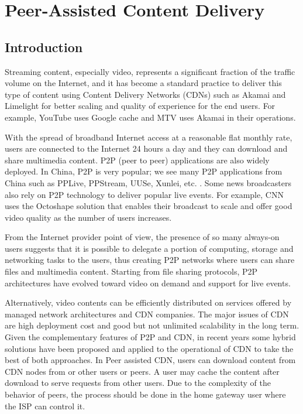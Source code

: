 \chapter{Peer-Assisted Content Delivery}

\section{Introduction}

Streaming content, especially video, represents a significant fraction of the traffic volume on the Internet, and it has become a standard practice to deliver this type of content using Content Delivery Networks (CDNs) such as Akamai and Limelight for better scaling and quality of experience for the end users. 
For example, YouTube uses Google cache and MTV uses Akamai in their operations.

With the spread of broadband Internet access at a reasonable flat monthly rate, users are connected to the Internet 24 hours a day and they can download and share multimedia content. P2P (peer to peer) applications are also widely deployed. 
In China, P2P is very popular; we see many P2P applications from China such as PPLive, PPStream, UUSe, Xunlei, etc. \cite{Vu:2010:UOC:1865106.1865115}. 
Some news broadcasters also rely on P2P technology to deliver popular live events. 
For example, CNN uses the Octoshape \cite{octoshape} solution that enables their broadcast to scale and offer good video quality as the number of users increases.

From the Internet provider point of view, the presence of so many always-on users suggests that it is possible to delegate a portion of computing, storage and networking tasks to the users, thus creating P2P networks where users can share files and multimedia content. 
Starting from file sharing protocols, P2P architectures have evolved toward video on demand and support for live events.

Alternatively, video contents can be efficiently distributed on services offered by managed network architectures and CDN companies.
The major issues of CDN are high deployment cost and good but not unlimited scalability in the long term.  
Given the complementary features of P2P and CDN, in recent years some hybrid solutions have been proposed and applied to the operational of CDN \cite{Huang:2008:UHC:1496046.1496064,4772628,Yin:2009:DDH:1631272.1631279} to take the best of both approaches.
In Peer assisted CDN, users can download content from CDN nodes from or other users or peers. 
A user may cache the content after download to serve requests from other users. 
Due to the complexity of the behavior of peers, the process should be done in the home gateway user where the ISP can control it.

